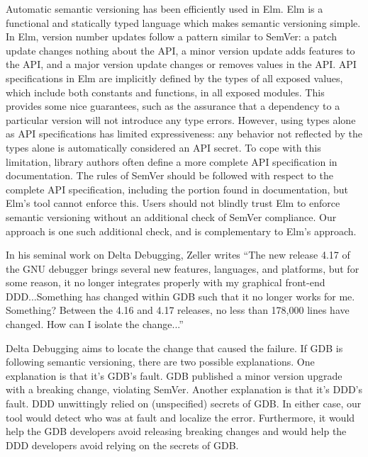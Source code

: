 Automatic semantic versioning has been efficiently used in Elm. Elm
is a functional and statically typed language which makes semantic
versioning simple. In Elm, version number updates follow a pattern
similar to SemVer: a patch update changes nothing about the API, a
minor version update adds features to the API, and a major version
update changes or removes values in the API. API specifications in
Elm are implicitly defined by the types of all exposed values, which
include both constants and functions, in all exposed modules. This
provides some nice guarantees, such as the assurance that a
dependency to a particular version will not introduce any type
errors. However, using types alone as API specifications has limited
expressiveness: any behavior not reflected by the types alone is
automatically considered an API secret. To cope with this limitation,
library authors often define a more complete API specification in
documentation. The rules of SemVer should be followed with respect to
the complete API specification, including the portion found in
documentation, but Elm's tool cannot enforce this. Users should not
blindly trust Elm to enforce semantic versioning without an
additional check of SemVer compliance. Our approach is one such
additional check, and is complementary to Elm's approach.

In his seminal work on Delta Debugging, Zeller writes ``The new
release 4.17 of the GNU debugger brings several new features,
languages, and platforms, but for some reason, it no longer
integrates properly with my graphical front-end DDD...Something has
changed within GDB such that it no longer works for me. Something?
Between the 4.16 and 4.17 releases, no less than 178,000 lines have
changed. How can I isolate the change...''

Delta Debugging aims to locate the change that caused the failure. If
GDB is following semantic versioning, there are two possible
explanations. One explanation is that it's GDB's fault. GDB published
a minor version upgrade with a breaking change, violating
SemVer. Another explanation is that it's DDD's fault. DDD unwittingly
relied on (unspecified) secrets of GDB. In either case, our tool
would detect who was at fault and localize the error. Furthermore, it
would help the GDB developers avoid releasing breaking changes and
would help the DDD developers avoid relying on the secrets of GDB.

